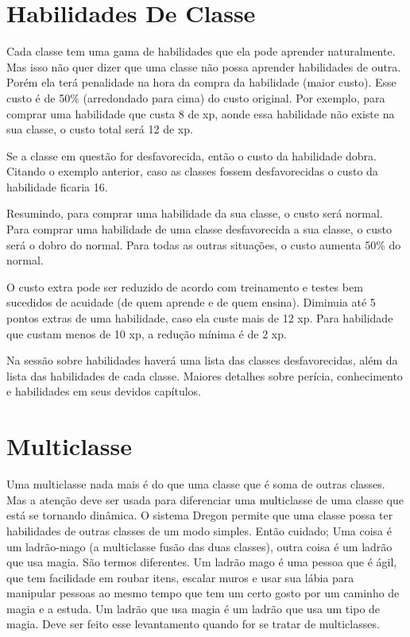\section{Habilidades De Classe}

Cada classe tem uma gama de habilidades que ela pode aprender naturalmente. Mas isso não quer dizer que uma classe não possa aprender habilidades de outra. Porém ela terá penalidade na hora da compra da habilidade (maior custo). Esse custo é de 50\% (arredondado para cima) do custo original. Por exemplo, para comprar uma habilidade que custa 8 de xp, aonde essa habilidade não existe na sua classe, o custo total será 12 de xp. 

Se a classe em questão for desfavorecida, então o custo da habilidade dobra. Citando o exemplo anterior, caso as classes fossem desfavorecidas o custo da habilidade ficaria 16. 

Resumindo, para comprar uma habilidade da sua classe, o custo será normal. Para comprar uma habilidade de uma classe desfavorecida a sua classe, o custo será o dobro do normal. Para todas as outras situações, o custo aumenta 50\% do normal.

O custo extra pode ser reduzido de acordo com treinamento e testes bem sucedidos de acuidade (de quem aprende e de quem ensina). Diminuia até 5 pontos extras de uma habilidade, caso ela custe mais de 12 xp. Para habilidade que custam menos de 10 xp, a redução mínima é de 2 xp.

Na sessão sobre habilidades haverá uma lista das classes desfavorecidas, além da lista das habilidades de cada classe. Maiores detalhes sobre perícia, conhecimento e habilidades em seus devidos capítulos.


\section{Multiclasse}

Uma multiclasse nada mais é do que uma classe que é soma de outras classes. Mas a atenção deve ser usada para diferenciar uma multiclasse de uma classe que está se tornando dinâmica. O sistema Dregon permite que uma classe possa ter habilidades de outras classes de um modo simples. Então cuidado; Uma coisa é um ladrão-mago (a multiclasse fusão das duas classes), outra coisa é um ladrão que usa magia. São termos diferentes. Um ladrão mago é uma pessoa que é ágil, que tem facilidade em roubar itens, escalar muros e usar sua lábia para manipular pessoas ao mesmo tempo que tem um certo gosto por um caminho de magia e a estuda. Um ladrão que usa magia é um ladrão que usa um tipo de magia. Deve ser feito esse levantamento quando for se tratar de multiclasses.      

